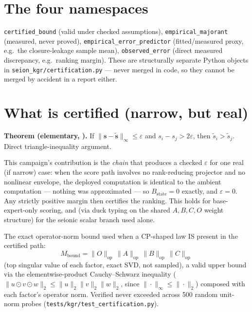 \documentclass[11pt]{article}
\begin{document}

\tableofcontents

\section{The four namespaces}
\texttt{certified\_bound} (valid under checked assumptions), \texttt{empirical\_majorant}
(measured, never proved), \texttt{empirical\_error\_predictor} (fitted/measured proxy, e.g.\ the
closure-leakage sample mean), \texttt{observed\_error} (direct measured discrepancy, e.g.\ ranking
margin). These are structurally separate Python objects in \texttt{seion\_kgr/certification.py}
--- never merged in code, so they cannot be merged by accident in a report either.

\section{What is certified (narrow, but real)}
\label{sec:narrow}
\textbf{Theorem (elementary, \Proved).} If $\|\mathbf s - \tilde{\mathbf s}\|_\infty \le \varepsilon$
and $s_i - s_j > 2\varepsilon$, then $\tilde s_i > \tilde s_j$. Direct triangle-inequality argument.

This campaign's contribution is the \emph{chain} that produces a checked $\varepsilon$ for one real
(if narrow) case: when the score path involves no rank-reducing projector and no nonlinear
envelope, the deployed computation is identical to the ambient computation --- nothing was
approximated --- so $B_{\text{state}} = 0$ exactly, and $\varepsilon = 0$. Any strictly positive
margin then certifies the ranking. This holds for base-expert-only scoring, and (via duck typing on
the shared $A,B,C,O$ weight structure) for the seionic scalar branch used alone.

The exact operator-norm bound used when a CP-shaped law IS present in the certified path:
\[
  M_{\text{bound}} = \|O\|_{\text{op}}\,\|A\|_{\text{op}}\,\|B\|_{\text{op}}\,\|C\|_{\text{op}}
\]
(top singular value of each factor, exact SVD, not sampled),
a valid upper bound via the elementwise-product Cauchy--Schwarz inequality
($\|u\odot v\odot w\|_2 \le \|u\|_2\|v\|_2\|w\|_2$, since $\|\cdot\|_\infty \le \|\cdot\|_2$)
composed with each factor's operator norm. Verified never exceeded across 500 random unit-norm
probes (\texttt{tests/kgr/test\_certification.py}).
\end{document}
